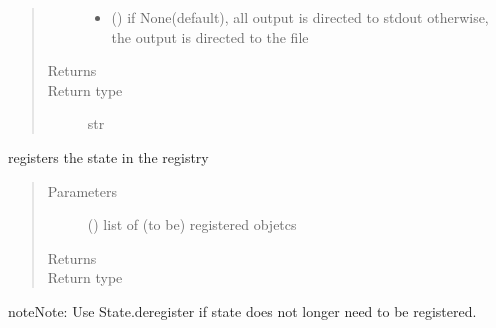 \documentclass[letterpaper,10pt,english]{sphinxmanual}
\begin{document}
\begin{fulllineitems}
\begin{fulllineitems}
\begin{quote}
\begin{description}
\begin{itemize}
\item {} 
 () \textendash{} if None(default), all output is directed to stdout 
otherwise, the output is directed to the file

\end{itemize}

\item[{Returns}] \leavevmode
{}

\item[{Return type}] \leavevmode
str

\end{description}\end{quote}

\end{fulllineitems}


\begin{fulllineitems}
\label{\detokenize{Reference:salabim.State.register}}
registers the state in the registry
\begin{quote}\begin{description}
\item[{Parameters}] \leavevmode
{} () \textendash{} list of (to be) registered objetcs

\item[{Returns}] \leavevmode
{}

\item[{Return type}] \leavevmode
{\hyperref[\detokenize{Reference:salabim.State}]{}}

\end{description}\end{quote}

\begin{sphinxadmonition}{note}{Note:}
Use State.deregister if state does not longer need to be registered.
\end{sphinxadmonition}

\end{fulllineitems}



\end{fulllineitems}
\end{document}

